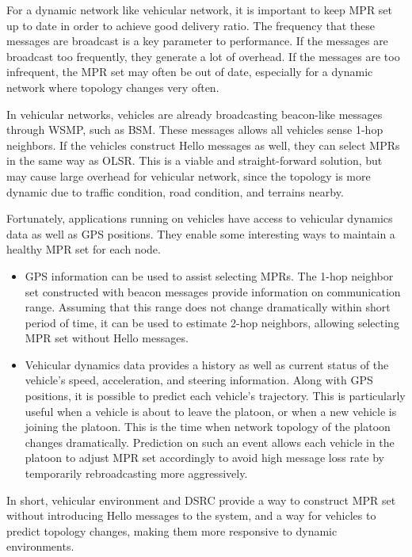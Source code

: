 \documentclass[12pt]{report}
\begin{document}
For a dynamic network like vehicular network, it is important to keep MPR set up to date in order to achieve good delivery ratio. The frequency that these messages are broadcast is a key parameter to performance. If the messages are broadcast too frequently, they generate a lot of overhead. If the messages are too infrequent, the MPR set may often be out of date, especially for a dynamic network where topology changes very often.

In vehicular networks, vehicles are already broadcasting beacon-like messages through WSMP, such as BSM. These messages allows all vehicles sense 1-hop neighbors. If the vehicles construct Hello messages as well, they can select MPRs in the same way as OLSR. This is a viable and straight-forward solution, but may cause large overhead for vehicular network, since the topology is more dynamic due to traffic condition, road condition, and terrains nearby.

Fortunately, applications running on vehicles have access to vehicular dynamics data as well as GPS positions. They enable some interesting ways to maintain a healthy MPR set for each node.

\begin{itemize}
  \item GPS information can be used to assist selecting MPRs. The 1-hop neighbor set constructed with beacon messages provide information on communication range. Assuming that this range does not change dramatically within short period of time, it can be used to estimate 2-hop neighbors, allowing selecting MPR set without Hello messages.
  \item Vehicular dynamics data provides a history as well as current status of the vehicle's speed, acceleration, and steering information. Along with GPS positions, it is possible to predict each vehicle's trajectory. This is particularly useful when a vehicle is about to leave the platoon, or when a new vehicle is joining the platoon. This is the time when network topology of the platoon changes dramatically. Prediction on such an event allows each vehicle in the platoon to adjust MPR set accordingly to avoid high message loss rate by temporarily rebroadcasting more aggressively.
\end{itemize}

In short, vehicular environment and DSRC provide a way to construct MPR set without introducing Hello messages to the system, and a way for vehicles to predict topology changes, making them more responsive to dynamic environments.
\end{document}
